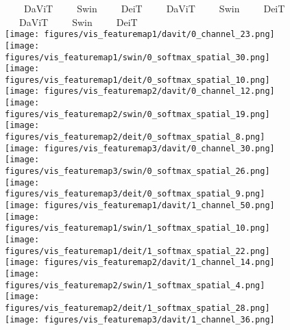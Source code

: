 \documentclass[runningheads]{llncs}
\begin{document}
\begin{figure}[t]
\centering
\footnotesize
~~~~DaViT~~~~~Swin~~~~~DeiT~~~~~DaViT~~~~~Swin~~~~~DeiT~~~~~DaViT~~~~~Swin~~~~~DeiT~~
\\
\vspace{0.5mm}
\texttt{[image: figures/vis\_featuremap1/davit/0\_channel\_23.png]}\hspace{-0.2pt}
\texttt{[image: figures/vis\_featuremap1/swin/0\_softmax\_spatial\_30.png]}\hspace{-0.2pt}
\texttt{[image: figures/vis\_featuremap1/deit/0\_softmax\_spatial\_10.png]}\hspace{1.5pt}
\texttt{[image: figures/vis\_featuremap2/davit/0\_channel\_12.png]}\hspace{-0.2pt}
\texttt{[image: figures/vis\_featuremap2/swin/0\_softmax\_spatial\_19.png]}\hspace{-0.2pt}
\texttt{[image: figures/vis\_featuremap2/deit/0\_softmax\_spatial\_8.png]}\hspace{1.5pt}
\texttt{[image: figures/vis\_featuremap3/davit/0\_channel\_30.png]}\hspace{-0.2pt}
\texttt{[image: figures/vis\_featuremap3/swin/0\_softmax\_spatial\_26.png]}\hspace{-0.2pt}
\texttt{[image: figures/vis\_featuremap3/deit/0\_softmax\_spatial\_9.png]}
\\
\vspace{0.5mm}
\texttt{[image: figures/vis\_featuremap1/davit/1\_channel\_50.png]}\hspace{-0.2pt}
\texttt{[image: figures/vis\_featuremap1/swin/1\_softmax\_spatial\_10.png]}\hspace{-0.2pt}
\texttt{[image: figures/vis\_featuremap1/deit/1\_softmax\_spatial\_22.png]}\hspace{1.5pt}
\texttt{[image: figures/vis\_featuremap2/davit/1\_channel\_14.png]}\hspace{-0.2pt}
\texttt{[image: figures/vis\_featuremap2/swin/1\_softmax\_spatial\_4.png]}\hspace{-0.2pt}
\texttt{[image: figures/vis\_featuremap2/deit/1\_softmax\_spatial\_28.png]}\hspace{1.5pt}
\texttt{[image: figures/vis\_featuremap3/davit/1\_channel\_36.png]}\hspace{-0.2pt}

\end{figure}
\end{document}

